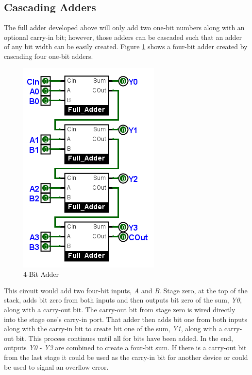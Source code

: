 \subsection{Cascading Adders}
\label{CL:subsec:cascading_adders}

The full adder developed above will only add two one-bit numbers along with an optional carry-in bit; however, those adders can be cascaded such that an adder of any bit width can be easily created. Figure \ref{fig:08_07} shows a four-bit adder created by cascading four one-bit adders. 

\begin{figure}[H]
	\centering
	\includegraphics[width=\maxwidth{.95\linewidth}]{gfx/08_07}
	\caption{4-Bit Adder}
	\label{fig:08_07}
\end{figure}

This circuit would add two four-bit inputs, \emph{A} and \emph{B}. Stage zero, at the top of the stack, adds bit zero from both inputs and then outputs bit zero of the sum, \emph{Y0}, along with a carry-out bit. The carry-out bit from stage zero is wired directly into the stage one's carry-in port. That adder then adds bit one from both inputs along with the carry-in bit to create bit one of the sum, \emph{Y1}, along with a carry-out bit. This process continues until all for bits have been added. In the end, outputs \emph{Y0} - \emph{Y3} are combined to create a four-bit sum. If there is a carry-out bit from the last stage it could be used as the carry-in bit for another device or could be used to signal an overflow error.

